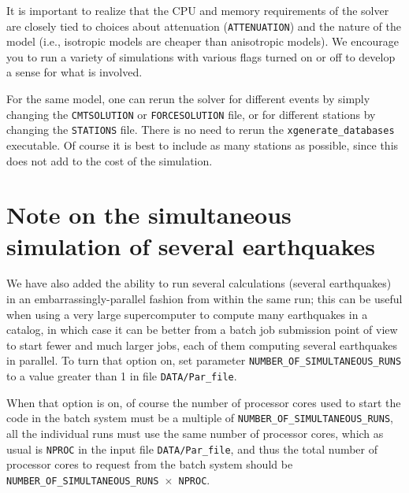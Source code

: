 It is important to realize that the CPU and memory requirements of
the solver are closely tied to choices about attenuation (\texttt{ATTENUATION})
and the nature of the model (i.e., isotropic models are cheaper than
anisotropic models). We encourage you to run a variety of simulations
with various flags turned on or off to develop a sense for what is
involved.\newline


For the same model, one can rerun the solver for different events
by simply changing the \texttt{CMTSOLUTION} or \texttt{FORCESOLUTION}
file, or for different stations by changing the \texttt{STATIONS}
file. There is no need to rerun the \texttt{xgenerate\_databases}
executable. Of course it is best to include as many stations as possible,
since this does not add to the cost of the simulation.


\section{Note on the simultaneous simulation of several earthquakes}

We have also added the ability to run several calculations (several earthquakes)
in an embarrassingly-parallel fashion from within the same run;
this can be useful when using a very large supercomputer to compute
many earthquakes in a catalog, in which case it can be better from
a batch job submission point of view to start fewer and much larger jobs,
each of them computing several earthquakes in parallel.
To turn that option on, set parameter \texttt{NUMBER\_OF\_SIMULTANEOUS\_RUNS}
to a value greater than 1 in file \texttt{DATA/Par\_file}.\newline


When that option is on, of course the number of processor cores used to start
the code in the batch system must be a multiple of \texttt{NUMBER\_OF\_SIMULTANEOUS\_RUNS},
all the individual runs must use the same number of processor cores,
which as usual is \texttt{NPROC} in the input file \texttt{DATA/Par\_file},
and thus the total number of processor cores to request from the batch system
should be \texttt{NUMBER\_OF\_SIMULTANEOUS\_RUNS $\times$ NPROC}.\newline


